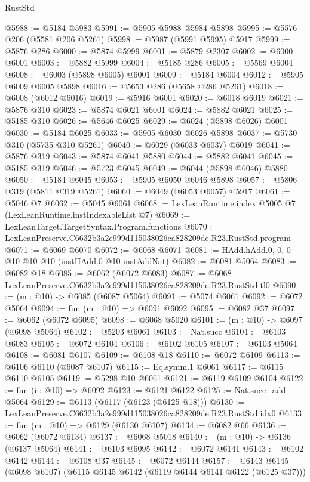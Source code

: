 \begin{lexlean}{RustStd}
\begin{coremodule}
@5988 := @5184 @5983
@5991 := @5905 @5988 @5984 @5898
@5995 := @5576 @206 (@5581 @206 @5261)
@5998 := @5987 (@5991 @5995) @5917
@5999 := @5876 @286
@6000 := @5874 @5999
@6001 := @5879 @2307
@6002 := @6000 @6001
@6003 := @5882 @5999
@6004 := @5185 @286
@6005 := @5569 @6004
@6008 := @6003 (@5898 @6005) @6001
@6009 := @5184 @6004
@6012 := @5905 @6009 @6005 @5898
@6016 := @5653 @286 (@5658 @286 @5261)
@6018 := @6008 (@6012 @6016)
@6019 := @5916 @6001
@6020 := @6018 @6019
@6021 := @5876 @310
@6023 := @5874 @6021 @6001
@6024 := @5882 @6021
@6025 := @5185 @310
@6026 := @5646 @6025
@6029 := @6024 (@5898 @6026) @6001
@6030 := @5184 @6025
@6033 := @5905 @6030 @6026 @5898
@6037 := @5730 @310 (@5735 @310 @5261)
@6040 := @6029 (@6033 @6037) @6019
@6041 := @5876 @319
@6043 := @5874 @6041 @5880
@6044 := @5882 @6041
@6045 := @5185 @319
@6046 := @5723 @6045
@6049 := @6044 (@5898 @6046) @5880
@6050 := @5184 @6045
@6053 := @5905 @6050 @6046 @5898
@6057 := @5806 @319 (@5811 @319 @5261)
@6060 := @6049 (@6053 @6057) @5917
@6061 := @5046 @7
@6062 := @5045 @6061
@6068 := LexLeanRuntime.index @5005 @7 (LexLeanRuntime.instIndexableList @7)
@6069 := LexLeanTarget.TargetSyntax.Program.functions
@6070 := LexLeanPreserve.C6632b3a2e999d115038026ca828209de.R23.RustStd.program
@6071 := @6069 @6070
@6072 := @6068 @6071
@6081 := HAdd.hAdd.{0, 0, 0} @10 @10 @10 (instHAdd.{0} @10 instAddNat)
@6082 := @6081 @5064
@6083 := @6082 @18
@6085 := @6062 (@6072 @6083)
@6087 := @6068 LexLeanPreserve.C6632b3a2e999d115038026ca828209de.R23.RustStd.tl0
@6090 := (m : @10) -> @6085 (@6087 @5064)
@6091 := @5074 @6061
@6092 := @6072 @5064
@6094 := fun (m : @10) => @6091 @6092
@6095 := @6082 @37
@6097 := @6062 (@6072 @6095)
@6098 := @6068 @5020
@6101 := (m : @10) -> @6097 (@6098 @5064)
@6102 := @5203 @6061
@6103 := Nat.succ
@6104 := @6103 @6083
@6105 := @6072 @6104
@6106 := @6102 @6105
@6107 := @6103 @5064
@6108 := @6081 @6107
@6109 := @6108 @18
@6110 := @6072 @6109
@6113 := @6106 @6110 (@6087 @6107)
@6115 := Eq.symm.{1} @6061
@6117 := @6115 @6110 @6105
@6119 := @5298 @10 @6061
@6121 := @6119 @6109 @6104
@6122 := fun (i : @10) => @6092
@6123 := @6121 @6122
@6125 := Nat.succ_add @5064
@6129 := @6113 (@6117 (@6123 (@6125 @18)))
@6130 := LexLeanPreserve.C6632b3a2e999d115038026ca828209de.R23.RustStd.idx0
@6133 := fun (m : @10) => @6129 (@6130 @6107)
@6134 := @6082 @66
@6136 := @6062 (@6072 @6134)
@6137 := @6068 @5018
@6140 := (m : @10) -> @6136 (@6137 @5064)
@6141 := @6103 @6095
@6142 := @6072 @6141
@6143 := @6102 @6142
@6144 := @6108 @37
@6145 := @6072 @6144
@6157 := @6143 @6145 (@6098 @6107) (@6115 @6145 @6142 (@6119 @6144 @6141 @6122 (@6125 @37)))

\end{coremodule}
\end{lexlean}
